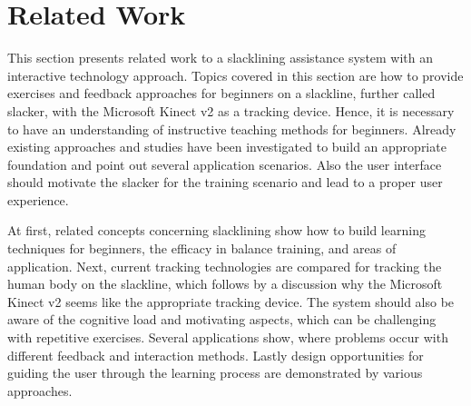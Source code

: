 \chapter{Related Work}\label{2_relatedWork}

This section presents related work to a slacklining assistance system with an interactive technology approach.
Topics covered in this section are how to provide exercises and feedback approaches for beginners on a slackline, further called slacker, with the Microsoft Kinect v2 as a tracking device.
Hence, it is necessary to have an understanding of instructive teaching methods for beginners.
Already existing approaches and studies have been investigated to build an appropriate foundation and point out several application scenarios.
Also the user interface should motivate the slacker for the training scenario and lead to a proper user experience.

At first, related concepts concerning slacklining show how to build learning techniques for beginners, the efficacy in balance training, and areas of application.
Next, current tracking technologies are compared for tracking the human body on the slackline, which follows by a  discussion why the Microsoft Kinect v2 seems like the appropriate tracking device.
The system should also be aware of the cognitive load and motivating aspects, which can be challenging with repetitive exercises.
Several applications show, where problems occur with different feedback and interaction methods.
Lastly design opportunities for guiding the user through the learning process are demonstrated by various approaches.

\label{2_1_slacklineTraining}

\label{2_2_interactiveTechnology}

\label{2_3_feedbackMethods}

\label{2_4_uiDesign}


\newpage
